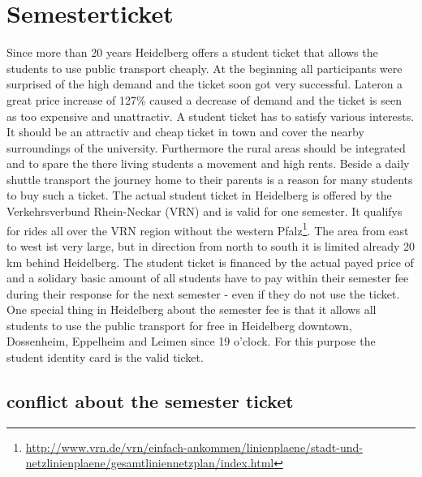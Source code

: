 %

\section{Semesterticket}
Since more than 20 years Heidelberg offers a student ticket that allows the students to use public transport cheaply. At the beginning all participants were surprised of the high demand and the ticket soon got very successful. Lateron a great price increase of 127\% caused a decrease of demand and the ticket is seen as too expensive and unattractiv.
A student ticket has to satisfy various interests. It should be an attractiv and cheap ticket in town and cover the nearby surroundings of the university. Furthermore the rural areas should be integrated and to spare the there living students a movement and high rents. Beside a daily shuttle transport the journey home to their parents is a reason for many students to buy such a ticket.
The actual student ticket in Heidelberg is offered by the Verkehrsverbund Rhein-Neckar (VRN) and is valid for one semester. It qualifys for rides all over the VRN region without the western Pfalz\footnote{\url{http://www.vrn.de/vrn/einfach-ankommen/linienplaene/stadt-und-netzlinienplaene/gesamtliniennetzplan/index.html}}. The area from east to west ist very large, but in direction from north to south it is limited already 20 km behind Heidelberg.
The student ticket is financed by the actual payed price of \EUR{\semesterticket} and a solidary basic amount of \EUR{\sockelbeitrag} all students have to pay within their semester fee during their response for the next semester - even if they do not use the ticket. One special thing in Heidelberg about the semester fee is that it allows all students to use the public transport for free in Heidelberg downtown, Dossenheim, Eppelheim and Leimen since 19 o'clock. For this purpose the student identity card is the valid ticket.

\subsection{conflict about the semester ticket}

